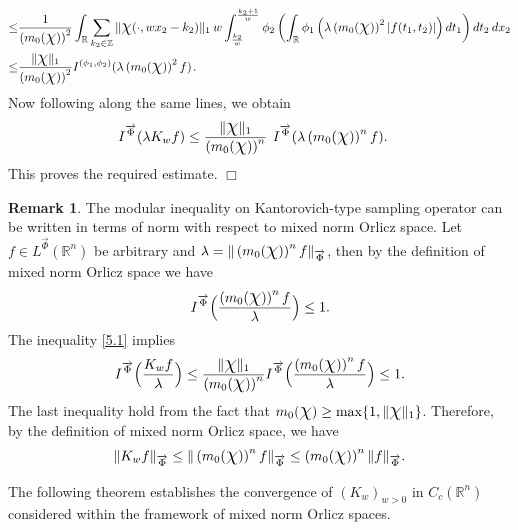 \documentclass[11pt, a4paper]{article}
\theoremstyle{definition}
\newtheorem{rem}[thm]{Remark}
\newcommand{\qedwhite}{\hfill \ensuremath{\Box}}
\renewenvironment{proof}{{\raggedright \bfseries Proof.}}{\qedwhite}
\numberwithin{equation}{section}
\def\ZZ{\mathbb Z}
\def\RR{\mathbb R}
\def\Chi{\mbox{\Large$\chi$}}
\newcommand{\priyanka}[1]{{\color{blue}{[PM: #1]}}}
\newcommand{\dlp}[1]{{\color{red}{[DP: #1]}}}
\newcommand{\vc}[1]{\overrightarrow{#1}}
\begin{document}
\begin{proof}
\begin{align*}
					\leq& \frac{1}{\left(m_{0}(\Chi)\right)^2}\int_{\RR} \sum_{k_2 \in \ZZ} \|\Chi(\cdot,wx_2-k_2)\|_1 \hspace{2pt}w \int_{\frac{k_2}{w}}^{\frac{k_2+1}{w}}  \phi_2 \left(\int_{\RR}  \phi_1 \left(\lambda\left(m_{0}(\Chi)\right)^2|f(t_1,t_2)|\right)dt_1\right)dt_2\hspace{2pt} dx_2\\
				\leq& \frac{\|\Chi\|_{1}}{\left(m_{0}(\Chi)\right)^2}I^{(\phi_1,\phi_2)}( \lambda\left( m_{0}(\Chi)\right)^2f)\hspace{1pt}.
		\end{align*}
Now	following along the same lines, we obtain
	\begin{equation*}
		\begin{split}
	I^{\overrightarrow{\Phi}}(\lambda K_wf)
	&\leq \frac{\|\Chi\|_1 }{\left( m_{0}(\Chi)\right)^n}\hspace{2pt}\hspace{2pt}I^{ \overrightarrow{\Phi}}(\lambda \left( m_{0}(\Chi)\right)^n f).
	\end{split}
	\end{equation*}
This proves the required estimate.
\end{proof}


\begin{rem}\label{rem 5.2}
The modular inequality on Kantorovich-type sampling operator can be written in terms of norm with respect to mixed norm Orlicz space. Let $f\in L^{\vc{\Phi}}(\RR^n)$ be arbitrary and $\lambda=\|\left(m_0(\Chi)\right)^nf\|_{\vc{\Phi}}$, then by the definition of mixed norm Orlicz space we have $$I^{\vc{\Phi}}\Big(\frac{\left(m_0(\Chi)\right)^nf}{\lambda}\Big)\leq 1.$$ The inequality \eqref{5.1} implies
\begin{align*}
    I^{\vc{\Phi}}\Big(\frac{K_wf}{\lambda}\Big)\leq \frac{\|\Chi\|_1}{\left(m_0(\Chi)\right)^n}I^{\vc{\Phi}}\Big(\frac{\left(m_0(\Chi)\right)^nf}{\lambda}\Big)\leq 1.
\end{align*}
The last inequality hold from the fact that $m_0(\Chi)\geq \max\{1, \|\Chi\|_1\}$.
Therefore, by the definition of mixed  norm Orlicz space, we have
\begin{align*}
    \|K_wf\|_{\vc{\Phi}}\leq \|\left(m_0(\Chi)\right)^nf\|_{\vc{\Phi}}\leq \left(m_0(\Chi)\right)^n\|f\|_{\vc{\Phi}}. 
\end{align*}
\end{rem}

The following theorem establishes the convergence of \( (K_w)_{w>0} \) in \( C_c(\mathbb{R}^n) \)
 considered within the framework of mixed norm Orlicz spaces.
\end{document}
